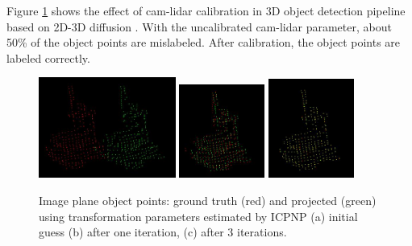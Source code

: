 \documentclass{article}
\begin{document}
Figure \ref{fig:icpnpresult} shows the effect of cam-lidar calibration in 3D object detection pipeline based on 2D-3D diffusion \cite{wang2019ldls}. With the uncalibrated cam-lidar parameter, about 50\% of the object points are mislabeled. After calibration, the object points are labeled correctly.
\begin{figure}[]
	\centering
{
	    \includegraphics[width=0.4\textwidth]{images/icpnp_iter0.JPG}
}
{
	    \includegraphics[width=0.25\textwidth]{images/icpnp_iter1.JPG}
}
{
	    \includegraphics[width=0.25\textwidth]{images/icpnp_iter4.JPG}
}   
	\caption{Image plane object points: ground truth (red) and projected (green) using transformation parameters estimated by ICPNP 
    (a) initial guess (b) after one iteration, (c) after 3 iterations.   }
\label{fig:icpnpresult}
\end{figure}
\end{document}
